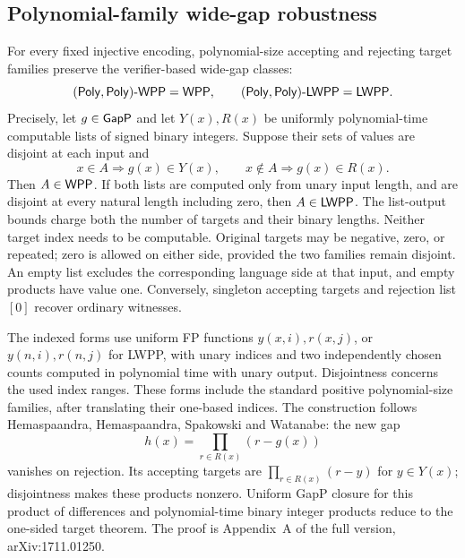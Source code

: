 \begin{result}
\subsection{Polynomial-family wide-gap robustness}
For every fixed injective encoding, polynomial-size accepting and rejecting target families
preserve the verifier-based wide-gap classes:
\[
\mathsf{(Poly,Poly)\text{-}WPP}=\mathsf{WPP},\qquad
\mathsf{(Poly,Poly)\text{-}LWPP}=\mathsf{LWPP}.
\]
Precisely, let $g\in\mathsf{GapP}$ and let $Y(x),R(x)$ be uniformly polynomial-time computable
lists of signed binary integers. Suppose their sets of values are disjoint at each input and
\[
x\in A\Rightarrow g(x)\in Y(x),\qquad
x\notin A\Rightarrow g(x)\in R(x).
\]
Then $A\in\mathsf{WPP}$. If both lists are computed only from unary input length, and are
disjoint at every natural length including zero, then $A\in\mathsf{LWPP}$.
The list-output bounds charge both the number of targets and their binary lengths.
Neither target index needs to be computable. Original targets may be negative, zero, or
repeated; zero is allowed on either side, provided the two families remain disjoint.
An empty list excludes the corresponding language side at that input, and empty products
have value one. Conversely, singleton accepting targets and rejection list $[0]$ recover
ordinary witnesses.

The indexed forms use uniform FP functions $y(x,i),r(x,j)$, or $y(n,i),r(n,j)$ for LWPP,
with unary indices and two independently chosen counts computed in polynomial time with unary output.
Disjointness concerns the used index ranges. These forms include the standard positive
polynomial-size families, after translating their one-based indices.
The construction follows Hemaspaandra, Hemaspaandra, Spakowski and Watanabe: the new gap
\[
h(x)=\prod_{r\in R(x)}(r-g(x))
\]
vanishes on rejection. Its accepting targets are
$\prod_{r\in R(x)}(r-y)$ for $y\in Y(x)$; disjointness makes these products nonzero.
Uniform GapP closure for this product of differences and polynomial-time binary integer
products reduce to the
one-sided target theorem.\citep[Definition 3.8, Corollary 3.11 and Theorem 3.12]{HemaspaandraEtAl2018}
The proof is Appendix~A of the full version, arXiv:1711.01250.


\end{result}
